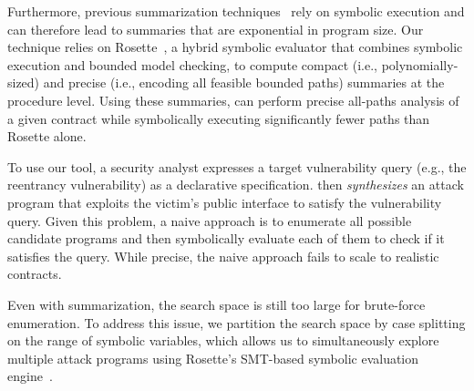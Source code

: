 Furthermore, previous summarization techniques~\cite{AnandGT08,Godefroid07} rely on symbolic execution and 
can therefore lead to summaries that are exponential in program size. 
Our technique relies on Rosette~\cite{rosette}, a hybrid symbolic evaluator that combines symbolic execution and bounded model checking, 
to compute compact (i.e., polynomially-sized) and precise (i.e., encoding all feasible bounded paths) summaries at the procedure level. 
Using these summaries, \toolname can perform precise all-paths analysis of 
 a given contract
while symbolically executing significantly fewer paths than Rosette alone.

To use our tool, a
security analyst expresses a target vulnerability query (e.g., the reentrancy
vulnerability) as a declarative specification.  
\toolname then \emph{synthesizes} an attack program that exploits the victim's public
interface to satisfy the vulnerability query. Given this problem, a naive
approach is to enumerate all possible candidate programs and then symbolically
evaluate each of them to check if it satisfies the query. While precise, the
naive approach fails to scale to realistic contracts. 

Even with summarization, the search space
is still too large for brute-force enumeration. To address this issue, we
partition the search space by case splitting on the range of symbolic variables,
which allows us to simultaneously explore multiple attack programs using Rosette's 
SMT-based symbolic evaluation engine~\cite{rosette}. 

